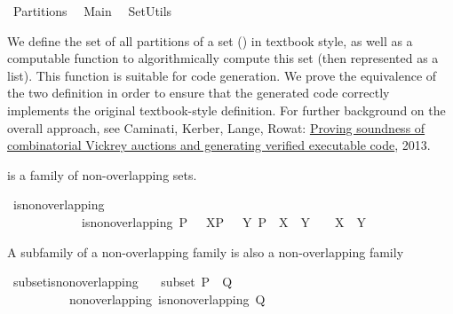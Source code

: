 %
\begin{isabellebody}%
\def\isabellecontext{Partitions}%
%
\isamarkuptrue%
%
\isadelimtheory
%
\endisadelimtheory
%
\isatagtheory
{}\isamarkupfalse%
\ Partitions\isanewline
{}\isanewline
\ \ Main\isanewline
\ \ SetUtils\isanewline
\isanewline
{}%
\endisatagtheory
{\isafoldtheory}%
%
\isadelimtheory
%
\endisadelimtheory
%
\begin{isamarkuptext}%
We define the set of all partitions of a set () in textbook style, as well as a computable function  to algorithmically compute this set (then represented as a list).  This function is suitable for code generation.  We prove the equivalence of the two definition in order to ensure that the generated code correctly implements the original textbook-style definition.  For further background on the overall approach, see Caminati, Kerber, Lange, Rowat: \href{http://arxiv.org/abs/1308.1779}{Proving soundness of combinatorial Vickrey auctions and generating verified executable code}, 2013.%
\end{isamarkuptext}%
\isamarkuptrue%
%
\begin{isamarkuptext}%
 is a family of non-overlapping  sets.%
\end{isamarkuptext}%
\isamarkuptrue%
\isamarkupfalse%
\ is{\isacharunderscore}non{\isacharunderscore}overlapping\ \isanewline
\ \ \ \ \ \ \ \ \ \ \ \ {\isachardoublequoteopen}is{\isacharunderscore}non{\isacharunderscore}overlapping\ P\ {\isacharequal}\ {\isacharparenleft}{\isasymforall}\ X{\isasymin}P\ {\isachardot}\ {\isasymforall}\ Y{\isasymin}\ P\ {\isachardot}\ {\isacharparenleft}X\ {\isasyminter}\ Y\ {\isasymnoteq}\ {\isacharbraceleft}{\isacharbraceright}\ {\isasymlongleftrightarrow}\ X\ {\isacharequal}\ Y{\isacharparenright}{\isacharparenright}{\isachardoublequoteclose}%
\begin{isamarkuptext}%
A subfamily of a non-overlapping family is also a non-overlapping family%
\end{isamarkuptext}%
\isamarkuptrue%
\isamarkupfalse%
\ subset{\isacharunderscore}is{\isacharunderscore}non{\isacharunderscore}overlapping{\isacharcolon}\isanewline
\ \ \ subset{\isacharcolon}\ {\isachardoublequoteopen}P\ {\isasymsubseteq}\ Q{\isachardoublequoteclose}\ \ \isanewline
\ \ \ \ \ \ \ \ \ \ non{\isacharunderscore}overlapping{\isacharcolon}\ {\isachardoublequoteopen}is{\isacharunderscore}non{\isacharunderscore}overlapping\ Q{\isachardoublequoteclose}\isanewline

\end{isabellebody}
